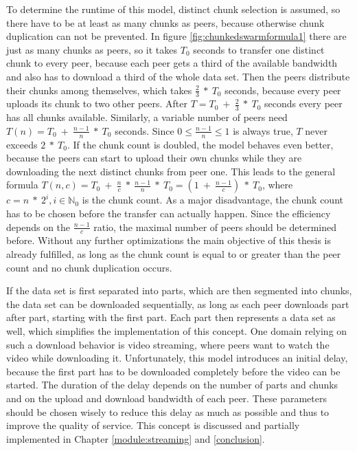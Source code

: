 To determine the runtime of this model, distinct chunk selection is assumed, so there have to be at least as many chunks as peers, because otherwise chunk duplication can not be prevented. In figure \ref{fig:chunkedswarmformula1} there are just as many chunks as peers, so it takes $T_0$ seconds to transfer one distinct chunk to every peer, because each peer gets a third of the available bandwidth and also has to download a third of the whole data set. Then the peers distribute their chunks among themselves, which takes $\frac{2}{3}\:*\:T_0$ seconds, because every peer uploads its chunk to two other peers. After $T = T_0\:+\:\frac{2}{3}\:*\:T_0$ seconds every peer has all chunks available. Similarly, a variable number of peers need $T(n) = T_0\:+\:\frac{n - 1}{n}\:*\:T_0$ seconds. Since $0 \leq \frac{n - 1}{n} \leq 1$ is always true, $T$ never exceeds $2\:*\:T_0$. If the chunk count is doubled, the model behaves even better, because the peers can start to upload their own chunks while they are downloading the next distinct chunks from peer one. This leads to the general formula $T(n, c) = T_0\:+\:\frac{n}{c}\:*\:\frac{n-1}{n}\:*\:T_0 = (1\:+\:\frac{n-1}{c})\:*\:T_0$, where $c = n\:*\:2^i, i \in \mathbb{N}_0$ is the chunk count. As a major disadvantage, the chunk count has to be chosen before the transfer can actually happen. Since the efficiency depends on the $\frac{n-1}{c}$ ratio, the maximal number of peers should be determined before. Without any further optimizations the main objective of this thesis is already fulfilled, as long as the chunk count is equal to or greater than the peer count and no chunk duplication occurs.

\vfill
\pagebreak

If the data set is first separated into parts, which are then segmented into chunks, the data set can be downloaded sequentially, as long as each peer downloads part after part, starting with the first part. Each part then represents a data set as well, which simplifies the implementation of this concept. One domain relying on such a download behavior is video streaming, where peers want to watch the video while downloading it. Unfortunately, this model introduces an initial delay, because the first part has to be downloaded completely before the video can be started. The duration of the delay depends on the number of parts and chunks and on the upload and download bandwidth of each peer. These parameters should be chosen wisely to reduce this delay as much as possible and thus to improve the quality of service. This concept is discussed and partially implemented in Chapter \ref{module:streaming} and \ref{conclusion}.

